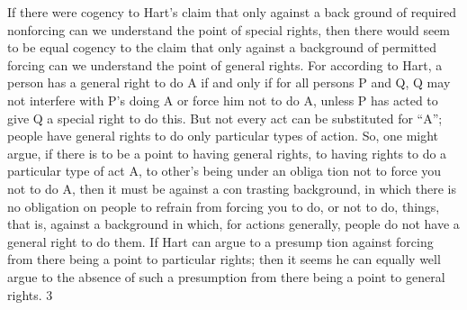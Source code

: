 \documentclass[11pt,openany]{book}
\begin{document}
If there were cogency to Hart's claim that only against a back ground of required nonforcing can we understand the point of special rights, then there would seem to be equal cogency to the claim that only against a background of permitted forcing can we understand the point of general rights. For according to Hart, a person has a general right to do A if and only if for all persons P and Q, Q may not interfere with P's doing A or force him not to do A, unless P has acted to give Q a special right to do this. But not every act can be substituted for ``A''; people have general rights to do only particular types of action. So, one might argue, if there is to be a point to having general rights, to having rights to do a particular type of act A, to other's being under an obliga tion not to force you not to do A, then it must be against a con trasting background, in which there is no obligation on people to refrain from forcing you to do, or not to do, things, that is, against a background in which, for actions generally, people do not have a general right to do them. If Hart can argue to a presump tion against forcing from there being a point to particular rights; then it seems he can equally well argue to the absence of such a presumption from there being a point to general rights. 3 
\end{document}
